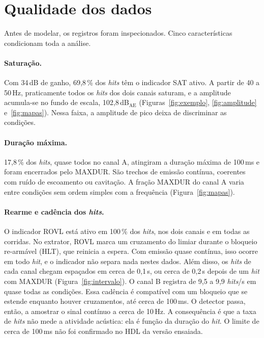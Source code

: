 \documentclass[12pt]{article}
\begin{document}
\section{Qualidade dos dados}
\label{sec:qualidade}

Antes de modelar, os registros foram inspecionados. Cinco características condicionam toda a análise.

\paragraph{Saturação.} Com 34\,dB de ganho, 69,8\,\% dos \textit{hits} têm o indicador SAT ativo. A partir de 40 a 50\,Hz, praticamente todos os \textit{hits} dos dois canais saturam, e a amplitude acumula-se no fundo de escala, 102,8\,dB\(_{\mathrm{AE}}\) (Figuras~\ref{fig:exemplo}, \ref{fig:amplitude} e~\ref{fig:mapas}). Nessa faixa, a amplitude de pico deixa de discriminar as condições.

\paragraph{Duração máxima.} 17,8\,\% dos \textit{hits}, quase todos no canal A, atingiram a duração máxima de 100\,ms e foram encerrados pelo MAXDUR. São trechos de emissão contínua, coerentes com ruído de escoamento ou cavitação. A fração MAXDUR do canal A varia entre condições sem ordem simples com a frequência (Figura~\ref{fig:mapas}).

\paragraph{Rearme e cadência dos \textit{hits}.} O indicador ROVL está ativo em 100\,\% dos \textit{hits}, nos dois canais e em todas as corridas. No extrator, ROVL marca um cruzamento do limiar durante o bloqueio re-armável (HLT), que reinicia a espera. Com emissão quase contínua, isso ocorre em todo \textit{hit}, e o indicador não separa nada nestes dados. Além disso, os \textit{hits} de cada canal chegam espaçados em cerca de 0,1\,s, ou cerca de 0,2\,s depois de um \textit{hit} com MAXDUR (Figura~\ref{fig:intervalo}). O canal B registra de 9,5 a 9,9 \textit{hits}/s em quase todas as condições. Essa cadência é compatível com um bloqueio que se estende enquanto houver cruzamentos, até cerca de 100\,ms. O detector passa, então, a amostrar o sinal contínuo a cerca de 10\,Hz. A consequência é que a taxa de \textit{hits} não mede a atividade acústica: ela é função da duração do \textit{hit}. O limite de cerca de 100\,ms não foi confirmado no HDL da versão ensaiada.
\end{document}
